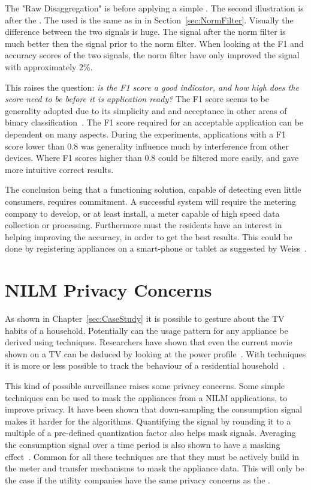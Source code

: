 The "Raw Disaggregation" is before applying a simple . The second illustration is after the . The  used is the same as in in Section~\ref{sec:NormFilter}. Visually the difference between the two signals is huge. The signal after the norm filter is much better then the signal prior to the norm filter. When looking at the F1 and accuracy scores of the two signals, the norm filter have only improved the signal with approximately 2\%.  

This raises the question: \textit{is the F1 score a good indicator, and how high does the score need to be before it is application ready?} The F1 score seems to be generality adopted due to its simplicity and and acceptance in other areas of binary classification~\citep{RefWorks:35}. The F1 score required for an acceptable application can be dependent on many aspects. During the experiments, applications with a F1 score lower than 0.8 was generality influence much by interference from other devices. Where F1 scores higher than 0.8 could be filtered more easily, and gave more intuitive correct results.  

The conclusion being that a functioning  solution, capable of detecting even little consumers, requires commitment. A successful system will require the metering company to develop, or at least install, a meter capable of high speed data collection or processing. Furthermore must the residents have an interest in helping improving the accuracy, in order to get the best results. This could be done by registering appliances on a smart-phone or tablet as suggested by Weiss~\citep{RefWorks:23}.

\section{NILM Privacy Concerns}
As shown in Chapter~\ref{sec:CaseStudy} it is possible to gesture about the TV habits of a household. Potentially can the usage pattern for any appliance be derived using  techniques. Researchers have shown that even the current movie shown on a TV can be deduced by looking at the power profile~\citep{RefWorks:39}. With  techniques it is more or less possible to track the behaviour of a residential household~\citep{RefWorks:37}.

This kind of possible surveillance raises some privacy concerns. Some simple techniques can be used to mask the appliances from a NILM applications, to improve privacy. It have been shown that down-sampling the consumption signal makes it harder for the  algorithms. Quantifying the signal by rounding it to a multiple of a pre-defined quantization factor also helps mask signals. Averaging the consumption signal over a time period is also shown to have a masking effect~\citep{RefWorks:40}. Common for all these techniques are that they must be actively build in the meter and transfer mechanisms to mask the appliance data. This will only be the case if the utility companies have the same privacy concerns as the . 


